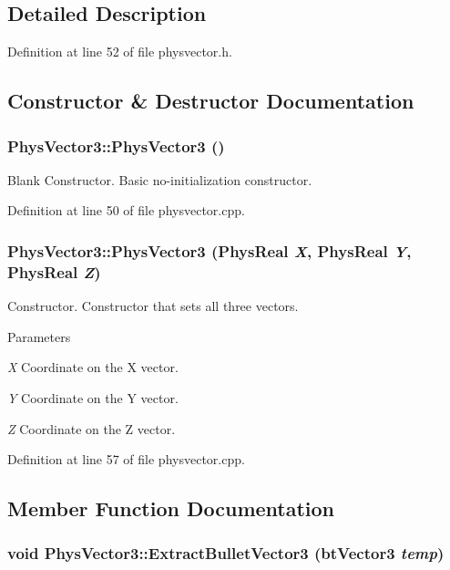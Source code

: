 \subsection{Detailed Description}


Definition at line 52 of file physvector.h.

\subsection{Constructor \& Destructor Documentation}
\hypertarget{classPhysVector3_a0d68895a6479ed7f875f666ce381afba}{
\subsubsection[{PhysVector3}]{\setlength{\rightskip}{0pt plus 5cm}PhysVector3::PhysVector3 ()}}
\label{da/d11/classPhysVector3_a0d68895a6479ed7f875f666ce381afba}


Blank Constructor. Basic no-\/initialization constructor. 

Definition at line 50 of file physvector.cpp.\hypertarget{classPhysVector3_aad8161121a45b20dde0e3cc6959801be}{
\subsubsection[{PhysVector3}]{\setlength{\rightskip}{0pt plus 5cm}PhysVector3::PhysVector3 (PhysReal {\em X}, \/  PhysReal {\em Y}, \/  PhysReal {\em Z})}}
\label{da/d11/classPhysVector3_aad8161121a45b20dde0e3cc6959801be}


Constructor. Constructor that sets all three vectors. 
\begin{DoxyParams}{Parameters}
\item[{\em X}]Coordinate on the X vector. \item[{\em Y}]Coordinate on the Y vector. \item[{\em Z}]Coordinate on the Z vector. \end{DoxyParams}


Definition at line 57 of file physvector.cpp.

\subsection{Member Function Documentation}
\hypertarget{classPhysVector3_a71a78da9e8011cb727010f8ba3acf546}{
\subsubsection[{ExtractBulletVector3}]{\setlength{\rightskip}{0pt plus 5cm}void PhysVector3::ExtractBulletVector3 (btVector3 {\em temp})}}
\label{da/d11/classPhysVector3_a71a78da9e8011cb727010f8ba3acf546}


